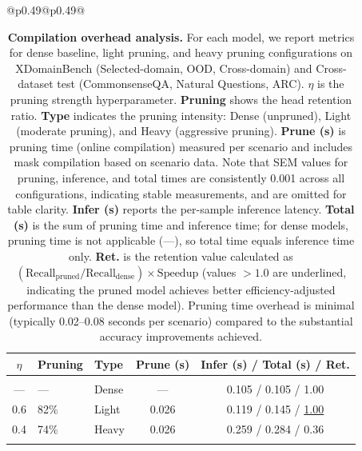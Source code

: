 \begin{table}[!htbp]
\caption{\textbf{Compilation overhead analysis.}
For each model, we report metrics for dense baseline, light pruning, and heavy pruning configurations on XDomainBench (Selected-domain, OOD, Cross-domain) and Cross-dataset test (CommonsenseQA, Natural Questions, ARC).
\textbf{$\eta$} is the pruning strength hyperparameter.
\textbf{Pruning} shows the head retention ratio.
\textbf{Type} indicates the pruning intensity: Dense (unpruned), Light (moderate pruning), and Heavy (aggressive pruning).
\textbf{Prune (s)} is pruning time (online compilation) measured per scenario and includes mask compilation based on scenario data. Note that SEM values for pruning, inference, and total times are consistently 0.001 across all configurations, indicating stable measurements, and are omitted for table clarity.
\textbf{Infer (s)} reports the per-sample inference latency.
\textbf{Total (s)} is the sum of pruning time and inference time; for dense models, pruning time is not applicable (---), so total time equals inference time only.
\textbf{Ret.} is the retention value calculated as $(\text{Recall}_{\text{pruned}} / \text{Recall}_{\text{dense}}) \times \text{Speedup}$ (values $>1.0$ are underlined, indicating the pruned model achieves better efficiency-adjusted performance than the dense model).
Pruning time overhead is minimal (typically 0.02--0.08 seconds per scenario) compared to the substantial accuracy improvements achieved.}
\vspace{-2mm}
\centering
\footnotesize
\setlength{\tabcolsep}{2.5pt}
\renewcommand{\arraystretch}{0.95}
\centering
\begin{tabular}{@{}p{}@{}p{}@{}}
\begin{tabular}{c l l c c}
\toprule
\textbf{$\eta$} & \textbf{Pruning} & \textbf{Type} & \textbf{Prune (s)} & \textbf{Infer (s)} / \textbf{Total (s)} / \textbf{Ret.} \\
\midrule
\rowcolor{lightgray} \multicolumn{5}{c}{\rule{0pt}{1.8ex}\textbf{Qwen2.5-7B (Selected-domain)}\rule[-0.6ex]{0pt}{0pt}} \\
--- & --- & Dense & --- & 0.105 / 0.105 / 1.00 \\
0.6 & 82\% & Light & 0.026 & 0.119 / 0.145 / \underline{1.00} \\
0.4 & 74\% & Heavy & 0.026 & 0.259 / 0.284 / 0.36 \\
\addlinespace[0.5pt]
\rowcolor{lightgray} \multicolumn{5}{c}{\rule{0pt}{2.2ex}\textbf{Qwen2.5-14B (Selected-domain)}\rule[-0.8ex]{0pt}{0pt}} \\

\end{tabular}
\end{tabular}
\end{table}
